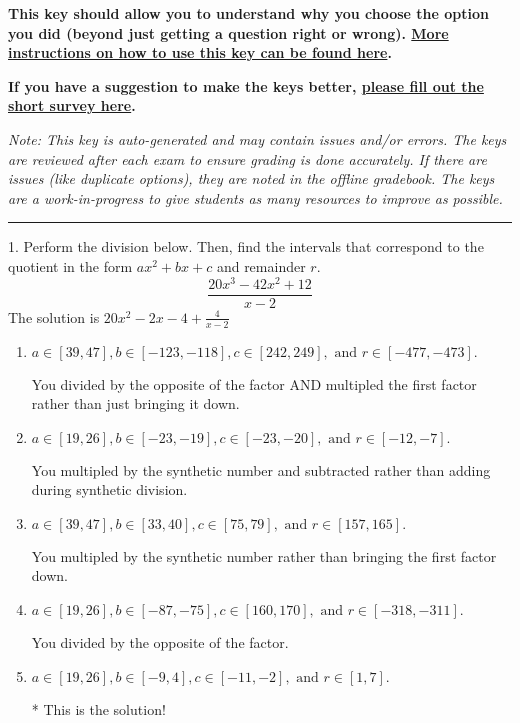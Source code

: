 \documentclass{extbook}[14pt]
\begin{document}
\textbf{This key should allow you to understand why you choose the option you did (beyond just getting a question right or wrong). \href{https://xronos.clas.ufl.edu/mac1105spring2020/courseDescriptionAndMisc/Exams/LearningFromResults}{More instructions on how to use this key can be found here}.}

\textbf{If you have a suggestion to make the keys better, \href{https://forms.gle/CZkbZmPbC9XALEE88}{please fill out the short survey here}.}

\textit{Note: This key is auto-generated and may contain issues and/or errors. The keys are reviewed after each exam to ensure grading is done accurately. If there are issues (like duplicate options), they are noted in the offline gradebook. The keys are a work-in-progress to give students as many resources to improve as possible.}

\rule{\textwidth}{0.4pt}

1. Perform the division below. Then, find the intervals that correspond to the quotient in the form $ax^2+bx+c$ and remainder $r$.
\[ \frac{20x^{3} -42 x^{2} + 12}{x -2} \] 
The solution is $ 20x^{2} -2 x -4 + \frac{4}{x -2} $ 

\begin{enumerate}[label=\Alph*.] 
\item $ a \in [39, 47], b \in [-123, -118], c \in [242, 249], \text{ and } r \in [-477, -473]. $ 

  You divided by the opposite of the factor AND multipled the first factor rather than just bringing it down. 
\item $ a \in [19, 26], b \in [-23, -19], c \in [-23, -20], \text{ and } r \in [-12, -7]. $ 

  You multipled by the synthetic number and subtracted rather than adding during synthetic division. 
\item $ a \in [39, 47], b \in [33, 40], c \in [75, 79], \text{ and } r \in [157, 165]. $ 

  You multipled by the synthetic number rather than bringing the first factor down. 
\item $ a \in [19, 26], b \in [-87, -75], c \in [160, 170], \text{ and } r \in [-318, -311]. $ 

  You divided by the opposite of the factor. 
\item $ a \in [19, 26], b \in [-9, 4], c \in [-11, -2], \text{ and } r \in [1, 7]. $ 

 * This is the solution! 
\end{enumerate} 
 
\end{document}
